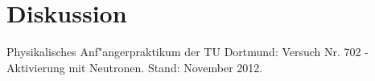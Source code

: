 \newpage
\section{Diskussion}
	\label{sec:diskussion}

\begin{thebibliography}{9}
	 Physikalisches Anf"angerpraktikum der TU Dortmund: Versuch Nr. 702 - Aktivierung mit Neutronen. Stand: November 2012.
\end{thebibliography}